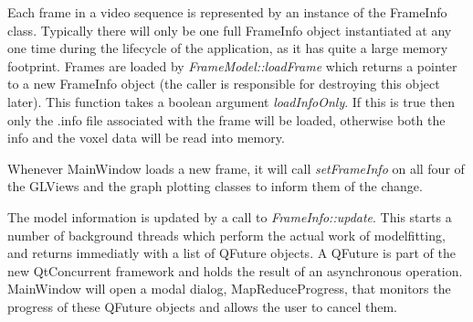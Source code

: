 Each frame in a video sequence is represented by an instance of the FrameInfo class.
Typically there will only be one full FrameInfo object instantiated at any one time during the lifecycle of the application, as it has quite a large memory footprint.
Frames are loaded by \emph{FrameModel::loadFrame} which returns a pointer to a new FrameInfo object (the caller is responsible for destroying this object later).
This function takes a boolean argument \emph{loadInfoOnly}.
If this is true then only the .info file associated with the frame will be loaded, otherwise both the info and the voxel data will be read into memory.

Whenever MainWindow loads a new frame, it will call \emph{setFrameInfo} on all four of the GLViews and the graph plotting classes to inform them of the change.

The model information is updated by a call to \emph{FrameInfo::update}.
This starts a number of background threads which perform the actual work of modelfitting, and returns immediatly with a list of QFuture objects.
A QFuture is part of the new QtConcurrent framework and holds the result of an asynchronous operation.
MainWindow will open a modal dialog, MapReduceProgress, that monitors the progress of these QFuture objects and allows the user to cancel them.


